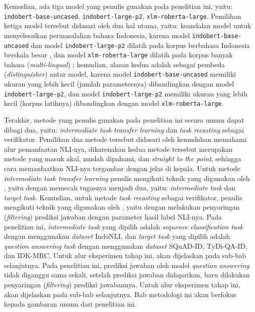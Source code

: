 Kemudian, ada tiga model yang penulis gunakan pada penelitian ini, yaitu: \texttt{indobert-base-uncased}, \texttt{indobert-large-p2}, \texttt{xlm-roberta-large}. Pemilihan ketiga model tersebut didasari oleh dua hal utama, yaitu: keandalan model untuk menyelesaikan permasalahan bahasa Indonesia, karena model \texttt{indobert-base-uncased} dan model \texttt{indobert-large-p2} dilatih pada korpus berbahasa Indonesia berskala besar \citep{koto2020indolem, cahyawijaya-etal-2021-indonlg}, dan model \texttt{xlm-roberta-large} dilatih pada korpus banyak bahasa (\emph{multi-lingual}) \citep{conneau2020unsupervised}; kemudian, alasan kedua adalah sebagai pembeda (\emph{distinguisher}) antar model, karena model \texttt{indobert-base-uncased} memiliki ukuran yang lebih kecil (jumlah parameternya) dibandingkan dengan model \texttt{indobert-large-p2}, dan model \texttt{indobert-large-p2} memiliki ukuran yang lebih kecil (korpus latihnya) dibandingkan dengan model \texttt{xlm-roberta-large}.

Terakhir, metode yang penulis gunakan pada penelitian ini secara umum dapat dibagi dua, yaitu: \emph{intermediate task transfer learning} dan \emph{task recasting} sebagai verifikator. Pemilihan dua metode tersebut didasari oleh kemudahan memahami alur pemanfaatan NLI-nya, dikarenakan kedua metode tersebut merupakan metode yang masuk akal, mudah dipahami, dan \emph{straight to the point}, sehingga cara memanfaatkan NLI-nya tergambar dengan jelas di kepala. Untuk metode \emph{intermediate task transfer learning} penulis mengikuti teknik yang digunakan oleh \citeauthor{pruksachatkun-etal-2020-intermediate}, yaitu dengan memecah tugasnya menjadi dua, yaitu: \emph{intermediate task} dan \emph{target task}. Kemudian, untuk metode \emph{task recasting}  sebagai verifikator, penulis mengikuti teknik yang digunakan oleh \citeauthor{chen-etal-2021-nli-models}, yaitu dengan melakukan penyaringan (\emph{filtering}) prediksi jawaban dengan parameter hasil label NLI-nya. Pada penelitian ini, \emph{intermediate task} yang dipilih adalah \emph{sequence classification task} dengan menggunakan \emph{dataset} IndoNLI, dan \emph{target task} yang dipilih adalah \emph{question answering task} dengan menggunakan \emph{dataset} SQuAD-ID, TyDi-QA-ID, dan IDK-MRC. Untuk alur eksperimen tahap ini, akan dijelaskan pada sub-bab selanjutnya. Pada penelitian ini, prediksi jawaban oleh model \emph{question answering} tidak diganggu sama sekali, setelah prediksi jawaban didapatkan, baru dilakukan penyaringan (\emph{filtering}) prediksi jawabannya. Untuk alur eksperimen tahap ini, akan dijelaskan pada sub-bab selanjutnya. Bab metodologi ini akan berfokus kepada gambaran umum dari penelitian ini.

